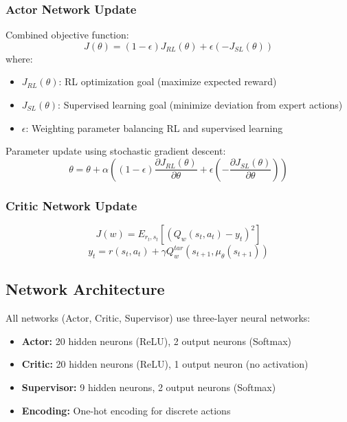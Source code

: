 \subsubsection*{Actor Network Update}
Combined objective function:
\begin{equation}
J(\theta) = (1 - \epsilon)J_{RL}(\theta) + \epsilon(-J_{SL}(\theta))
\end{equation}
where:
\begin{itemize}
    \item $J_{RL}(\theta)$: RL optimization goal (maximize expected reward)
    \item $J_{SL}(\theta)$: Supervised learning goal (minimize deviation from expert actions)
    \item $\epsilon$: Weighting parameter balancing RL and supervised learning
\end{itemize}

Parameter update using stochastic gradient descent:
\begin{equation}
\theta = \theta + \alpha\left((1-\epsilon)\frac{\partial J_{RL}(\theta)}{\partial\theta} + \epsilon\left(-\frac{\partial J_{SL}(\theta)}{\partial\theta}\right)\right)
\end{equation}

\subsubsection*{Critic Network Update}
\begin{equation}
J(w) = E_{r_t,s_t}\left[(Q_w(s_t,a_t) - y_t)^2\right]
\end{equation}
\begin{equation}
y_t = r(s_t,a_t) + \gamma Q^{tar}_w(s_{t+1}, \mu_\theta(s_{t+1}))
\end{equation}

\subsection*{Network Architecture}
All networks (Actor, Critic, Supervisor) use three-layer neural networks:
\begin{itemize}
    \item \textbf{Actor:} 20 hidden neurons (ReLU), 2 output neurons (Softmax)
    \item \textbf{Critic:} 20 hidden neurons (ReLU), 1 output neuron (no activation)
    \item \textbf{Supervisor:} 9 hidden neurons, 2 output neurons (Softmax)
    \item \textbf{Encoding:} One-hot encoding for discrete actions
\end{itemize}

